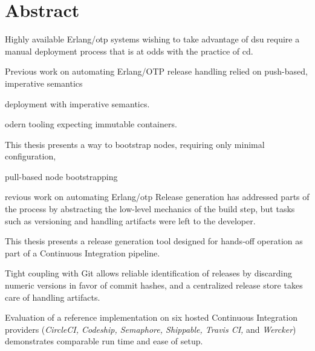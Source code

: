 \cleardoublepage{}

\section*{Abstract}

Highly available Erlang/\acrshort{otp} systems wishing to take advantage of \acrfull{dsu} require a manual deployment process that is at odds with the practice of \acrlong{cd}.

Previous work on automating Erlang/OTP release handling relied on push-based, imperative semantics

deployment with imperative semantics.

odern tooling expecting immutable containers.

This thesis presents a way to bootstrap nodes, requiring only minimal configuration,

pull-based node bootstrapping

revious work on automating Erlang/\acrshort{otp} Release generation has addressed parts of the process by abstracting the low-level mechanics of the build step, but tasks such as versioning and handling artifacts were left to the developer.

This thesis presents a release generation tool designed for hands-off operation as part of a Continuous Integration pipeline.

Tight coupling with Git allows reliable identification of releases by discarding numeric versions in favor of commit hashes, and a centralized release store takes care of handling artifacts.

Evaluation of a reference implementation on six hosted Continuous Integration providers (\emph{CircleCI, Codeship, Semaphore, Shippable, Travis CI,} and \emph{Wercker}) demonstrates comparable run time and ease of setup.
